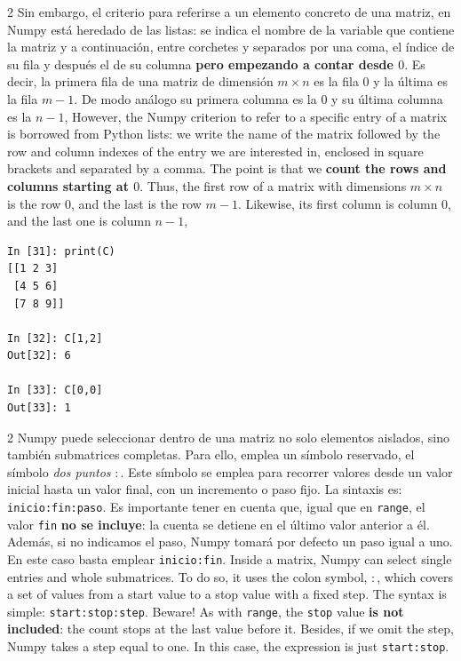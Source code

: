 \begin{paracol}{2}
Sin embargo,  el criterio para referirse a un elemento concreto de una matriz, en Numpy está heredado de las listas: se indica el nombre de la variable que contiene la matriz y a continuación, entre corchetes y separados por una coma, el índice de su fila y después el de su columna \textbf{pero empezando a contar desde $0$}. Es decir, la primera fila de una matriz de dimensión $m\times n$ es la fila $0$ y la última es la fila $m-1$. De modo análogo su primera columna es la $0$ y su última columna es la $n-1$,
\switchcolumn
However, the Numpy criterion to refer to a specific entry of a matrix is borrowed from Python lists: we write the name of the matrix followed by the row and column indexes of the entry we are interested in, enclosed in square brackets and separated by a comma. The point is that we \textbf{count the rows and columns starting at $0$}. Thus, the first row of a matrix with dimensions $m\times n$ is the row $0$, and the last is the row $m-1$. Likewise, its first column is column $0$, and the last one is column $n-1$, 
\end{paracol}
\begin{center}
    \begin{minipage}{0.3\textwidth}
        \begin{verbatim}
In [31]: print(C)
[[1 2 3]
 [4 5 6]
 [7 8 9]]

In [32]: C[1,2]
Out[32]: 6

In [33]: C[0,0]
Out[33]: 1
        \end{verbatim}
    \end{minipage}
\end{center}

\begin{paracol}{2}
Numpy puede seleccionar dentro de una matriz no solo elementos aislados, sino también submatrices completas. 
Para ello, emplea un símbolo reservado, el símbolo \emph{dos puntos} $:$. Este símbolo se emplea para recorrer valores desde un valor inicial hasta un valor final, con un incremento o paso fijo. La sintaxis es: \texttt{inicio:fin:paso}. Es importante tener en cuenta que, igual que en \texttt{range}, el valor \texttt{fin} \textbf{no se incluye}: la cuenta se detiene en el último valor anterior a él. Además, si no indicamos el paso, Numpy tomará por defecto un paso igual a uno. En este caso basta emplear \texttt{inicio:fin}.
\switchcolumn
Inside a matrix, Numpy can select single entries and whole submatrices. To do so, it uses the colon symbol, $:$, which covers a set of values from a start value to a stop value with a fixed step. The syntax is simple: \texttt{start:stop:step}. Beware! As with \texttt{range}, the \texttt{stop} value \textbf{is not included}: the count stops at the last value before it. Besides, if we omit the step, Numpy takes a step equal to one. In this case, the expression is just \texttt{start:stop}.
\end{paracol}


